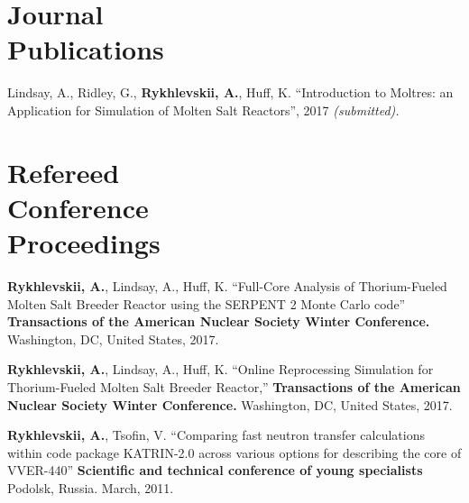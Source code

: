 \documentclass[margin,line]{resume}
\newcommand{\Cyclus}{\textsc{Cyclus}\xspace}%
\begin{document}
\begin{resume}
    \section{\mysidestyle Journal\\Publications}
      \begin{bibenum}
       \item Lindsay, A., Ridley, G., \textbf{Rykhlevskii, A.}, Huff, K. ``Introduction to 
               Moltres: an Application for Simulation of Molten Salt 
               Reactors'',  2017 \textsl{(submitted).} 
      \end{bibenum}
    \section{\mysidestyle Refereed\\Conference\\Proceedings}
    \begin{bibenum}
    \item \textbf{Rykhlevskii, A.}, Lindsay, A., Huff, K. ``Full-Core Analysis of Thorium-Fueled Molten Salt Breeder Reactor using the SERPENT 2 Monte Carlo code'' 
            \textbf{Transactions of the American Nuclear Society Winter Conference.} 
            Washington, DC, United States, 2017.
    \item \textbf{Rykhlevskii, A.}, Lindsay, A., Huff, K. ``Online Reprocessing Simulation for Thorium-Fueled Molten Salt Breeder Reactor,'' 
            \textbf{Transactions of the American Nuclear Society Winter Conference.} 
            Washington, DC, United States, 2017.
      \item \textbf{Rykhlevskii, A.}, Tsofin, V. ``Comparing fast neutron transfer calculations within code package KATRIN-2.0
across various options for describing the core of VVER-440''
         \textbf{Scientific and technical conference of young specialists}
         Podolsk, Russia. March, 2011.
	\end{bibenum}

\end{resume}
\end{document}
